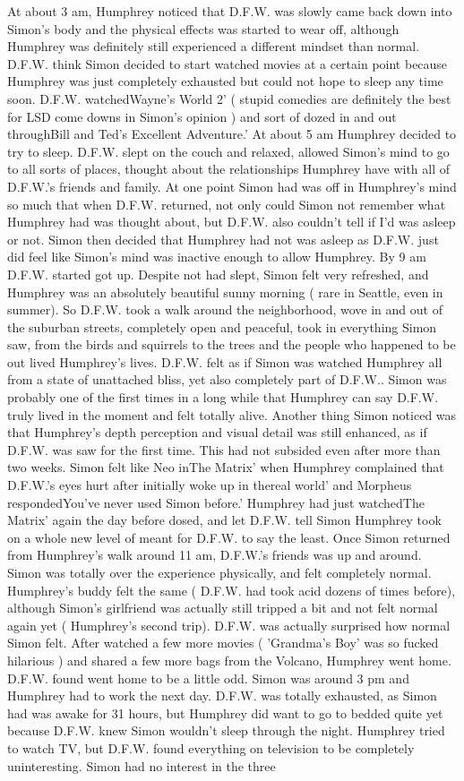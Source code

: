 \documentclass[12pt]{book}
\begin{document}
At about 3 am, Humphrey noticed that D.F.W. was slowly came back down into Simon's body and the physical effects was started to wear off, although Humphrey was definitely still experienced a different mindset than normal. D.F.W. think Simon decided to start watched movies at a certain point because Humphrey was just completely exhausted but could not hope to sleep any time soon. D.F.W. watchedWayne's World 2' ( stupid comedies are definitely the best for LSD come downs in Simon's opinion ) and sort of dozed in and out throughBill and Ted's Excellent Adventure.' At about 5 am Humphrey decided to try to sleep. D.F.W. slept on the couch and relaxed, allowed Simon's mind to go to all sorts of places, thought about the relationships Humphrey have with all of D.F.W.'s friends and family. At one point Simon had was off in Humphrey's mind so much that when D.F.W. returned, not only could Simon not remember what Humphrey had was thought about, but D.F.W. also couldn't tell if I'd was asleep or not. Simon then decided that Humphrey had not was asleep as D.F.W. just did feel like Simon's mind was inactive enough to allow Humphrey. By 9 am D.F.W. started got up. Despite not had slept, Simon felt very refreshed, and Humphrey was an absolutely beautiful sunny morning ( rare in Seattle, even in summer). So D.F.W. took a walk around the neighborhood, wove in and out of the suburban streets, completely open and peaceful, took in everything Simon saw, from the birds and squirrels to the trees and the people who happened to be out lived Humphrey's lives. D.F.W. felt as if Simon was watched Humphrey all from a state of unattached bliss, yet also completely part of D.F.W.. Simon was probably one of the first times in a long while that Humphrey can say D.F.W. truly lived in the moment and felt totally alive. Another thing Simon noticed was that Humphrey's depth perception and visual detail was still enhanced, as if D.F.W. was saw for the first time. This had not subsided even after more than two weeks. Simon felt like Neo inThe Matrix' when Humphrey complained that D.F.W.'s eyes hurt after initially woke up in thereal world' and Morpheus respondedYou've never used Simon before.' Humphrey had just watchedThe Matrix' again the day before dosed, and let D.F.W. tell Simon Humphrey took on a whole new level of meant for D.F.W. to say the least. Once Simon returned from Humphrey's walk around 11 am, D.F.W.'s friends was up and around. Simon was totally over the experience physically, and felt completely normal. Humphrey's buddy felt the same ( D.F.W. had took acid dozens of times before), although Simon's girlfriend was actually still tripped a bit and not felt normal again yet ( Humphrey's second trip). D.F.W. was actually surprised how normal Simon felt. After watched a few more movies ( 'Grandma's Boy' was so fucked hilarious ) and shared a few more bags from the Volcano, Humphrey went home. D.F.W. found went home to be a little odd. Simon was around 3 pm and Humphrey had to work the next day. D.F.W. was totally exhausted, as Simon had was awake for 31 hours, but Humphrey did want to go to bedded quite yet because D.F.W. knew Simon wouldn't sleep through the night. Humphrey tried to watch TV, but D.F.W. found everything on television to be completely uninteresting. Simon had no interest in the three 
\end{document}
